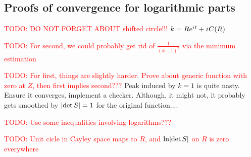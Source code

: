 \documentclass[12pt, a4paper]{article}
\DeclarePairedDelimiter{\abs}{\lvert}{\rvert}
\newcommand{\eexp}[1]{e^{#1}}
\newcommand{\iu}{{i\mkern1mu}}
\newcommand{\todo}[1]{{\large \textcolor{red}{TODO: #1}}}
\begin{document}
\subsection*{Proofs of convergence for logarithmic parts}
\todo{DO NOT FORGET ABOUT shifted circle!!! $k = R \eexp{\iu t} + \iu C(R)$}

\todo{For second, we could probably get rid of $\frac{1}{(k-1)^2}$ via the minimum estimation}

\todo{For first, things are slightly harder. Prove about generic function with zero at $Z$, then first implies second???}
Peak induced by $k=1$ is quite nasty. Ensure it converges, implement a checker. Although, it might not, it probably gets smoothed by $\abs{\det S} = 1$ for the original function....


\todo{Use some inequalities involving logarithms???}

\todo{Unit cicle in Cayley space maps to $R$, and $\ln\abs{\det S}$ on $R$ is zero everywhere}
\end{document}
